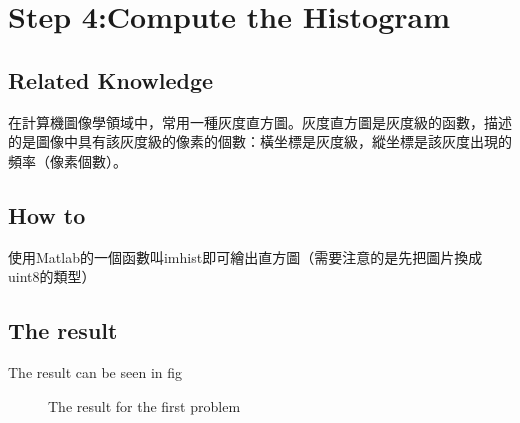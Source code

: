 \documentclass[a4paper,12pt]{article}%
\begin{document}
\section{Step 4:Compute the Histogram}
    \subsection{Related Knowledge}
        在計算機圖像學領域中，常用一種灰度直方圖。灰度直方圖是灰度級的函數，描述的是圖像中具有該灰度級的像素的個數：橫坐標是灰度級，縱坐標是該灰度出現的頻率（像素個數）。
    \subsection{How to}
        使用Matlab的一個函數叫imhist即可繪出直方圖（需要注意的是先把圖片換成uint8的類型）
    \subsection{The result}
        The result can be seen in fig

\begin{figure}
  \hspace{2in}
    \hspace{2in}
  \caption{The result for the first problem}
  \label{fig:subfig} %
\end{figure}
\end{document}
